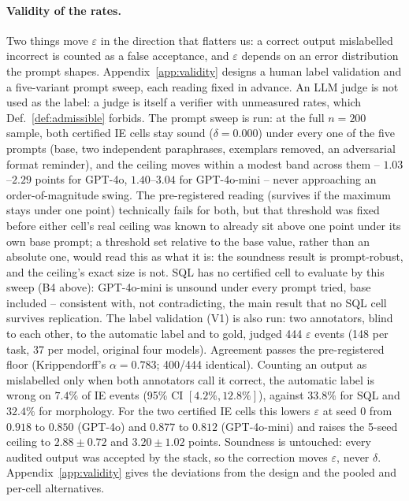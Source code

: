\documentclass[11pt]{article}
\begin{document}
\paragraph{Validity of the rates.} Two things move $\varepsilon$ in the
direction that flatters us: a correct output mislabelled incorrect is counted as
a false acceptance, and $\varepsilon$ depends on an error distribution the prompt
shapes. Appendix~\ref{app:validity} designs a human label validation and a five-variant
prompt sweep, each reading fixed in advance. An LLM judge is not used as the
label: a judge is itself a verifier with unmeasured rates, which
Def.~\ref{def:admissible} forbids. The prompt sweep is run: at the full $n{=}200$ sample, both certified IE cells stay
sound ($\delta=0.000$) under every one of the five prompts (base, two
independent paraphrases, exemplars removed, an adversarial format reminder),
and the ceiling moves within a modest band across them --
$1.03$--$2.29$ points for GPT-4o, $1.40$--$3.04$ for GPT-4o-mini -- never
approaching an order-of-magnitude swing. The pre-registered reading (survives
if the maximum stays under one point) technically fails for both, but that
threshold was fixed before either cell's real ceiling was known to already sit
above one point under its own base prompt; a threshold set relative to the
base value, rather than an absolute one, would read this as what it is: the
soundness result is prompt-robust, and the ceiling's exact size is not. SQL has
no certified cell to evaluate by this sweep (B4 above): GPT-4o-mini is
unsound under every prompt tried, base included -- consistent with, not
contradicting, the main result that no SQL cell survives replication. The label validation (V1) is also run: two annotators, blind to each other,
to the automatic label and to gold, judged 444 $\varepsilon$ events (148 per
task, 37 per model, original four models). Agreement passes the pre-registered
floor (Krippendorff's $\alpha=0.783$; 400/444 identical). Counting an output as
mislabelled only when both annotators call it correct, the automatic label is
wrong on $7.4\%$ of IE events (95\% CI $[4.2\%,12.8\%]$), against $33.8\%$ for
SQL and $32.4\%$ for morphology. For the two certified IE cells this lowers
$\varepsilon$ at seed 0 from $0.918$ to $0.850$ (GPT-4o) and $0.877$ to
$0.812$ (GPT-4o-mini) and raises the 5-seed ceiling to $2.88\pm0.72$ and
$3.20\pm1.02$ points. Soundness is untouched: every audited output was
accepted by the stack, so the correction moves $\varepsilon$, never $\delta$.
Appendix~\ref{app:validity} gives the deviations from the design and the
pooled and per-cell alternatives.
\end{document}
